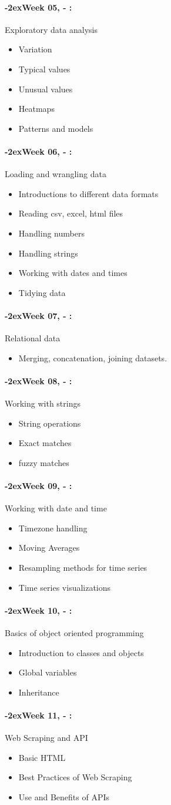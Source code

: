 \documentclass[11pt]{article}
\newcommand{\week}[1]{%
  \paragraph*{\kern-2ex\quad #1, \syldate{\today} - \AdvanceDate[4]\syldate{\today}:}%
  \ifdim\wd1=\wd\MONDAY
    \AdvanceDate[7]
  \else
    \AdvanceDate[7]
  \fi%
}
\begin{document}
\week{Week 05} Exploratory data analysis
\begin{itemize}
\item Variation
\item Typical values
\item Unusual values
\item Heatmaps
\item Patterns and models
\end{itemize}

\week{Week 06} Loading and wrangling data
\begin{itemize}
\item Introductions to different data formats
\item Reading csv, excel, html files
\item Handling numbers 
\item Handling strings
\item Working with dates and times
\item Tidying data
\end{itemize}

\week{Week 07} Relational data
\begin{itemize}
\item Merging, concatenation, joining datasets.
\end{itemize}

\week{Week 08} Working with strings
\begin{itemize}
\item String operations
\item Exact matches
\item fuzzy matches
\end{itemize}

\week{Week 09}  Working with date and time
\begin{itemize}
	\item Timezone handling
	\item Moving Averages
	\item Resampling methods for time series
	\item Time series visualizations
\end{itemize}
\week{Week 10} Basics of object oriented programming 
\begin{itemize}
\item Introduction to classes and objects
\item Global variables
\item Inheritance
\end{itemize}

\week{Week 11} Web Scraping and API
\begin{itemize}
\item Basic HTML
\item Best Practices of Web Scraping
\item Use and Benefits of APIs
\end{itemize}
\end{document}
